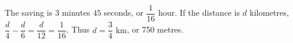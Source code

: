 The saving is $3$ minutes $45$ seconds, or $\dfrac{1}{16}$ hour. If the distance is $d$ kilometres, $\dfrac{d}{4}-\dfrac{d}{6}=\dfrac{d}{12}=\dfrac{1}{16}$. Thus $d=\boxed{\dfrac{3}{4}\text{ km}}$, or 750 metres.

